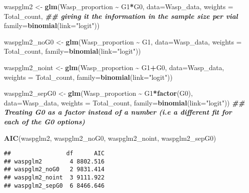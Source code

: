 \documentclass[
]{article}
\newenvironment{Shaded}{\begin{snugshade}}{\end{snugshade}}
\newcommand{\AttributeTok}[1]{\textcolor[rgb]{0.13,0.29,0.53}{#1}}
\newcommand{\DocumentationTok}[1]{\textcolor[rgb]{0.56,0.35,0.01}{\textbf{\textit{#1}}}}
\newcommand{\FunctionTok}[1]{\textcolor[rgb]{0.13,0.29,0.53}{\textbf{#1}}}
\newcommand{\NormalTok}[1]{#1}
\newcommand{\OtherTok}[1]{\textcolor[rgb]{0.56,0.35,0.01}{#1}}
\newcommand{\SpecialCharTok}[1]{\textcolor[rgb]{0.81,0.36,0.00}{\textbf{#1}}}
\newcommand{\StringTok}[1]{\textcolor[rgb]{0.31,0.60,0.02}{#1}}
\begin{document}
\begin{Shaded}
\begin{Highlighting}[]
\NormalTok{waspglm2 }\OtherTok{\textless{}{-}} \FunctionTok{glm}\NormalTok{(Wasp\_proportion }\SpecialCharTok{\textasciitilde{}}\NormalTok{ G1}\SpecialCharTok{*}\NormalTok{G0, }\AttributeTok{data=}\NormalTok{Wasp\_data,}
                \AttributeTok{weights =}\NormalTok{ Total\_count, }\DocumentationTok{\#\# giving it the information in the sample size per vial}
                \AttributeTok{family=}\FunctionTok{binomial}\NormalTok{(}\AttributeTok{link=}\StringTok{"logit"}\NormalTok{))}

\NormalTok{waspglm2\_noG0 }\OtherTok{\textless{}{-}} \FunctionTok{glm}\NormalTok{(Wasp\_proportion }\SpecialCharTok{\textasciitilde{}}\NormalTok{ G1, }\AttributeTok{data=}\NormalTok{Wasp\_data,}
                      \AttributeTok{weights =}\NormalTok{ Total\_count,}
                      \AttributeTok{family=}\FunctionTok{binomial}\NormalTok{(}\AttributeTok{link=}\StringTok{"logit"}\NormalTok{))}

\NormalTok{waspglm2\_noint }\OtherTok{\textless{}{-}} \FunctionTok{glm}\NormalTok{(Wasp\_proportion }\SpecialCharTok{\textasciitilde{}}\NormalTok{ G1}\SpecialCharTok{+}\NormalTok{G0, }\AttributeTok{data=}\NormalTok{Wasp\_data,}
                      \AttributeTok{weights =}\NormalTok{ Total\_count,}
                      \AttributeTok{family=}\FunctionTok{binomial}\NormalTok{(}\AttributeTok{link=}\StringTok{"logit"}\NormalTok{))}

\NormalTok{waspglm2\_sepG0 }\OtherTok{\textless{}{-}} \FunctionTok{glm}\NormalTok{(Wasp\_proportion }\SpecialCharTok{\textasciitilde{}}\NormalTok{ G1}\SpecialCharTok{*}\FunctionTok{factor}\NormalTok{(G0), }\AttributeTok{data=}\NormalTok{Wasp\_data,}
                      \AttributeTok{weights =}\NormalTok{ Total\_count,   }
                      \AttributeTok{family=}\FunctionTok{binomial}\NormalTok{(}\AttributeTok{link=}\StringTok{"logit"}\NormalTok{))}
\DocumentationTok{\#\# Treating G0 as a factor instead of a number (i.e a different fit for each of the G0 options)}

\FunctionTok{AIC}\NormalTok{(waspglm2, waspglm2\_noG0, waspglm2\_noint, waspglm2\_sepG0) }
\end{Highlighting}
\end{Shaded}

\begin{verbatim}
##                df      AIC
## waspglm2        4 8802.516
## waspglm2_noG0   2 9831.414
## waspglm2_noint  3 9111.922
## waspglm2_sepG0  6 8466.646
\end{verbatim}
\end{document}
